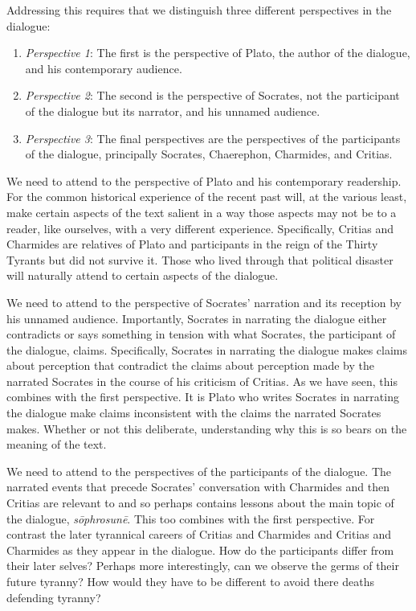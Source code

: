 Addressing this requires that we distinguish three different perspectives in the dialogue:

\begin{enumerate}[(1)]
	\item \emph{Perspective 1}: The first is the perspective of Plato, the author of the dialogue, and his contemporary audience.
	\item \emph{Perspective 2}: The second is the perspective of Socrates, not the participant of the dialogue but its narrator, and his unnamed audience.
	\item \emph{Perspective 3}: The final perspectives are the perspectives of the participants of the dialogue, principally Socrates, Chaerephon, Charmides, and Critias.
\end{enumerate}

We need to attend to the perspective of Plato and his contemporary readership. For the common historical experience of the recent past will, at the various least, make certain aspects of the text salient in a way those aspects may not be to a reader, like ourselves, with a very different experience. Specifically, Critias and Charmides are relatives of Plato and participants in the reign of the Thirty Tyrants but did not survive it. Those who lived through that political disaster will naturally attend to certain aspects of the dialogue.

We need to attend to the perspective of Socrates' narration and its reception by his unnamed audience. Importantly, Socrates in narrating the dialogue either contradicts or says something in tension with what Socrates, the participant of the dialogue, claims. Specifically, Socrates in narrating the dialogue makes claims about perception that contradict the claims about perception made by the narrated Socrates in the course of his criticism of Critias. As we have seen, this combines with the first perspective. It is Plato who writes Socrates in narrating the dialogue make claims inconsistent with the claims the narrated Socrates makes. Whether or not this deliberate, understanding why this is so bears on the meaning of the text. 

We need to attend to the perspectives of the participants of the dialogue. The narrated events that precede Socrates' conversation with Charmides and then Critias are relevant to and so perhaps contains lessons about the main topic of the dialogue, \emph{sōphrosunē}. This too combines with the first perspective. For contrast the later tyrannical careers of Critias and Charmides and Critias and Charmides as they appear in the dialogue. How do the participants differ from their later selves? Perhaps more interestingly, can we observe the germs of their future tyranny? How would they have to be different to avoid there deaths defending tyranny?

